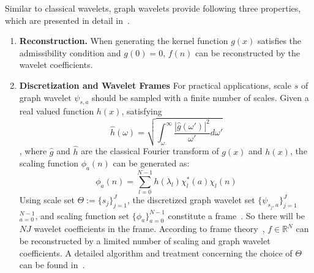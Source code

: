 Similar to classical wavelets, graph wavelets provide following three properties, which are presented in detail in~\cite{hammond2011wavelets}.
 \begin{enumerate}
 \item \textbf{Reconstruction.}
 When generating the kernel function $g(x)$ satisfies the admissibility condition and $g(0)=0$,  $f(n)$ can be reconstructed by the wavelet coefficients.
\item \textbf{Discretization and Wavelet Frames} For practical applications, scale $s$ of graph wavelet $\psi_{s,a}$ should be sampled with a finite number of scales. Given a real valued function $h(x)$, satisfying
\begin{equation}
\hat{h}(\omega) = \sqrt{\int_\omega^\infty\frac{|\hat{g}(\omega')|^2}{\omega'}d{\omega'} }
\end{equation}
, where $\hat{g}$ and $\hat{h}$ are the classical Fourier transform of $g(x)$ and $h(x)$, the scaling function $\phi_{a}(n)$ can be generated as:
\begin{equation}
\label{eq:graphscaledefinition}
\phi_{a}(n) = \sum\limits_{l=0}^{N-1}h(\lambda_l)\chi_l^*(a)\chi_l(n)
\end{equation}
Using scale set $\Theta:=\{s_j\}_{j=1}^J$, the discretized graph wavelet set $\{\psi_{s_j,a}\}_{j=1}^{J}$ $_{a=0}^{N-1}$, and scaling function set $\{\phi_a\}_{a=0}^{N-1}$ constitute a frame~\cite{hammond2011wavelets}.
So there will be $NJ$ wavelet coefficients in the frame.
According to frame theory~\cite{daubechies1992ten}, $f\in \mathbb{R}^N$ can be reconstructed by a limited number of scaling and graph wavelet coefficients. A detailed algorithm and treatment concerning the choice of $\Theta$ can be found in~\cite{hammond2011wavelets}.



\end{enumerate}

